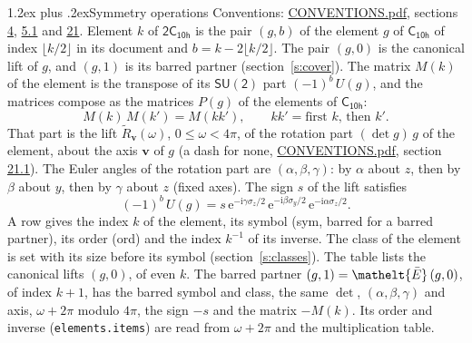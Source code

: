 \documentclass[10pt,a4paper]{article}
\makeatletter
\renewcommand\section{\@startsection{section}{1}{\z@}{-3ex plus -1ex minus -.2ex}%
  {1.2ex plus .2ex}{\normalfont\large\sffamily\bfseries\color{parttitle}}}
\numberwithin{equation}{section}
\newcommand{\eltfont}[1]{{\let\sigma\eltsigma\mathelt{#1}}}
\newcommand{\grp}[1]{\mathsf{#1}}
\newcommand{\elt}[1]{\eltfont{#1}}
\newcommand{\vv}{\mathbf{v}}
\newcommand{\iunit}{\mathrm{i}}
\newcommand{\expe}{\mathrm{e}}
\newcommand{\barred}[1]{\bar{#1}}
\newcommand{\lift}[1]{\tilde{#1}}
\newcommand{\pauli}[1]{\sigma_{#1}}
\makeatother
\begin{document}
\section{Symmetry operations}\label{s:elements}
Conventions: \href{../../CONVENTIONS.pdf}{CONVENTIONS.pdf}, sections \href{../../../rotation/CONVENTIONS.pdf\#conv.4}{4}, \href{../../../rotation/CONVENTIONS.pdf\#conv.5.1}{5.1} and \href{../../CONVENTIONS.pdf\#conv.21}{21}.
\leavevmode\label{n:index.element}\label{n:element.g}Element $k$ of $\grp{2C_{10h}}$ is the pair $(g, b)$ of the element $g$ of \href{../../../rotation/data/pdf/C10h.pdf}{$\grp{C_{10h}}$} of index $\lfloor k/2\rfloor$ in its document and $b = k - 2\lfloor k/2\rfloor$. The pair $(g, 0)$ is the canonical lift of $g$, and $(g, 1)$ is its barred partner (section~\ref{s:cover}). \label{n:matrix.element.pin}\label{n:matrix.element}The matrix $M(k)$ of the element is the transpose of its $\grp{SU(2)}$ part $(-1)^{b}\,U(g)$, and the matrices compose as the matrices $P(g)$ of the elements of $\grp{C_{10h}}$:
\begin{equation}\label{e:mprod}M(k)\,M(k') = M(kk'),\qquad kk' = \text{first } k\text{, then } k'.\end{equation}
\leavevmode\label{n:angle.omega}\label{n:vector.axis}\label{n:vector.pole}That part is the lift $\lift{R}_{\vv}(\omega)$, $0 \le \omega < 4\pi$, of the rotation part $(\det g)\,g$ of the element, about the axis $\vv$ of $g$ (a dash for none, \href{../../CONVENTIONS.pdf}{CONVENTIONS.pdf}, section \href{../../CONVENTIONS.pdf\#conv.21.1}{21.1}). \label{n:angle.euler.alpha}\label{n:angle.euler.beta}\label{n:angle.euler.gamma}\label{n:vector.coordinates}The Euler angles of the rotation part are $(\alpha,\beta,\gamma)$: by $\alpha$ about $z$, then by $\beta$ about $y$, then by $\gamma$ about $z$ (fixed axes). \label{n:local.euler.sign}The sign $s$ of the lift satisfies
\begin{equation}\label{e:euler}(-1)^{b}\,U(g) = s\,\expe^{-\iunit\gamma\pauli{z}/2}\,\expe^{-\iunit\beta\pauli{y}/2}\,\expe^{-\iunit\alpha\pauli{z}/2}.\end{equation}
\leavevmode\label{n:index.element.inverse}\label{n:head.sym}\label{n:head.ord}A row gives the index $k$ of the element, its symbol (sym, barred for a barred partner), its order (ord) and the index $k^{-1}$ of its inverse. \label{n:head.class}The class of the element is set with its size before its symbol (section~\ref{s:classes}).
The table lists the canonical lifts $(g, 0)$, of even $k$. The barred partner $(g, 1) = \elt{\barred{E}}\,(g, 0)$, of index $k + 1$, has the barred symbol and class, the same $\det$, $(\alpha,\beta,\gamma)$ and axis, $\omega + 2\pi$ modulo $4\pi$, the sign $-s$ and the matrix $-M(k)$. Its order and inverse (\texttt{elements.items}) are read from $\omega + 2\pi$ and the multiplication table.
\end{document}
